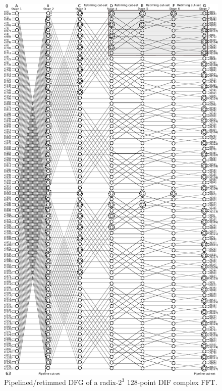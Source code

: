 \documentclass[journal,comsoc]{IEEEtran}
\begin{document}
\begin{small}

\end{small}


\begin{figure} 
	\centering
	\includegraphics[width=\linewidth]{Diagramas/miSeccionFiguras/128puntosRadix8BurbujasPipelined_Kevin.pdf}
	\caption{Pipelined/retimmed DFG of a radix-$2^3$ 128-point DIF complex FFT.}
	\label{fig:pipe_dfg_128}
\end{figure}
\end{document}
